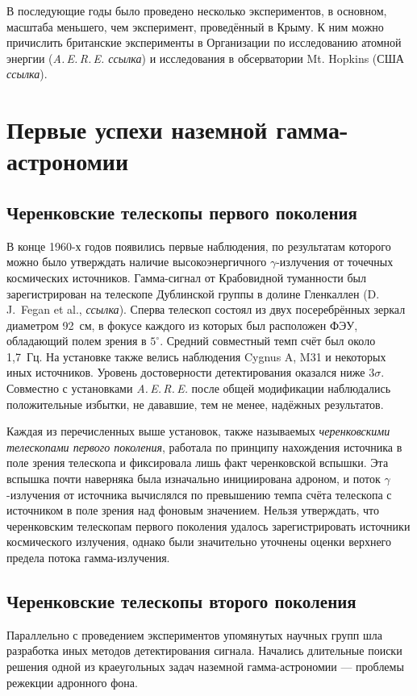 \documentclass[magd,floatypics,numeref]{msudipl} %
\begin{document}
В последующие годы было проведено несколько экспериментов, в основном, масштаба меньшего, чем эксперимент, проведённый в Крыму. К ним можно причислить британские эксперименты в Организации по исследованию атомной энергии (\textit{A.\,E.\,R.\,E.  ссылка}) и исследования в обсерватории Mt. Hopkins (США \textit{ссылка}).

\section{Первые успехи наземной гамма-астрономии}
\subsection{Черенковские телескопы первого поколения}
В конце 1960-х годов появились первые наблюдения, по результатам которого можно было утверждать наличие высокоэнергичного $\gamma$-излучения от точечных космических источников. Гамма-сигнал от Крабовидной туманности был зарегистрирован на телескопе Дублинской группы в долине Гленкаллен (D.\,J.~Fegan et al., \textit{ссылка}). Сперва телескоп состоял из двух посеребрённых зеркал диаметром 92~см, в фокусе каждого из которых был расположен ФЭУ, обладающий полем зрения в $5^{\circ}$. Средний совместный темп счёт был около 1,7~Гц. На установке также велись наблюдения Cygnus A, M31 и некоторых иных источников. Уровень достоверности детектирования оказался ниже $3\sigma$. Совместно с установками \textit{A.\,E.\,R.\,E.} после общей модификации наблюдались положительные избытки, не дававшие, тем не менее, надёжных результатов. 

Каждая из перечисленных выше установок, также называемых \textit{черенковскими телескопами первого поколения}, работала по принципу нахождения источника в поле зрения телескопа и фиксировала лишь факт черенковской вспышки. Эта вспышка почти наверняка была изначально инициирована адроном, и поток $\gamma$-излучения от источника вычислялся по превышению темпа счёта телескопа с источником в поле зрения над фоновым значением.  Нельзя утверждать, что черенковским телескопам первого поколения удалось зарегистрировать источники космического излучения, однако были значительно уточнены оценки верхнего предела потока гамма-излучения.
\subsection{Черенковские телескопы второго поколения}
Параллельно с проведением экспериментов упомянутых научных групп шла разработка иных методов детектирования сигнала. Начались длительные поиски решения одной из краеугольных задач наземной гамма-астрономии --- проблемы режекции адронного фона. 
\end{document}
